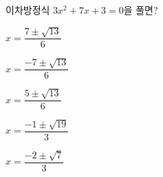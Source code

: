 이차방정식 $3x^2+7x+3=0$을 풀면?
\begin{choicesii}{\rule[-3ex]{0pt}{8ex}$x=\dfrac{7\pm\sqrt{13}}{6}$}{\rule[-3ex]{0pt}{8ex}$x=\dfrac{-7\pm\sqrt{13}}{6}$}{\rule[-3ex]{0pt}{8ex}$x=\dfrac{5\pm\sqrt{13}}{6}$}{\rule[-3ex]{0pt}{8ex}$x=\dfrac{-1\pm\sqrt{19}}{3}$}{\rule[-3ex]{0pt}{8ex}$x=\dfrac{-2\pm\sqrt{7}}{3}$}\end{choicesii}
